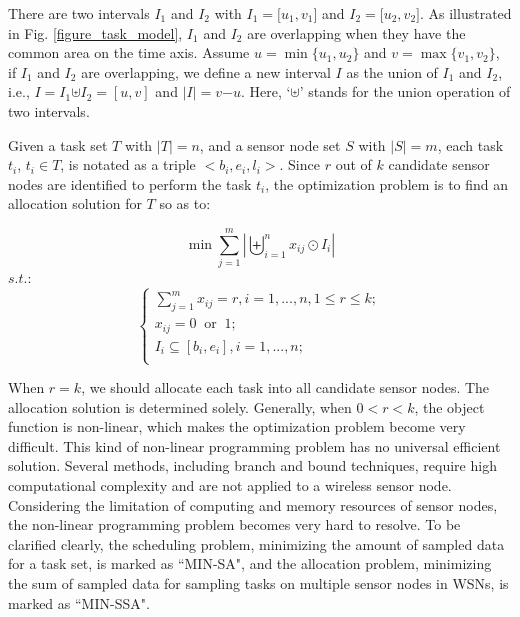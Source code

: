 \documentclass[prodmode,acmtosn]{acmsmall}
\begin{document}
\begin{definition}
There are two intervals $I_1$ and $I_2$ with $I_1\mathrm{=[}u_1, v_1\mathrm{]}$ and $I_2\mathrm{=[}u_2, v_2\mathrm{]}$. As illustrated in Fig. \ref{figure_task_model}, $I_1$ and $I_2$ are overlapping when they have the common area on the time axis.
Assume $u\mathrm{=}\min\{u_1,u_2\}$ and $v \mathrm{=}\max\{v_1,v_2\}$, if $I_1$ and $I_2$ are overlapping,  we define a new interval $I$ as the union of $I_1$ and $I_2$, i.e., $I\mathrm{=}I_1 \mathrm{\uplus} I_2\mathrm{=}[u, v]$  and $|I| \mathrm{=} v\mathrm{-}u$. Here, `$\mathrm{\uplus}$' stands for the union operation of two intervals.
\end{definition}

\begin{definition}
Given a task set $T$ with $|T|\mathrm{=}n$, and a sensor node set $S$ with $|S|\mathrm{=}m$, each task $t_i$, $t_i\mathrm{\in}T$, is notated as a triple $\mathrm{<}b_i,e_i,l_i\mathrm{>}$. Since $r$ out of $k$ candidate sensor nodes are identified to perform the task $t_i$, the optimization problem is to find an allocation solution for $T$  so as to:

\begin{equation}
\min\sum^m_{j\mathrm{=}1}{|\biguplus_{i\mathrm{=}1}^n x_{ij} \odot I_i|}
\end{equation}
$s.t.:$\\
\begin{equation}
\left\{ \begin{array}{ll}
\sum^m_{j\mathrm{=}1} x_{ij}\mathrm{=}r,i\mathrm{=}1,...,n,1\mathrm{\le} r \mathrm{\le} k;\\
x_{ij}\mathrm{=}0  \; \; \mathrm{or} \;\; 1;\\
I_i\subseteq[b_i,e_i],i\mathrm{=}1,...,n;\\

\end{array} \right.
\end{equation}
\end{definition}

When $r\mathrm{=}k$, we should allocate each task into all candidate sensor nodes. The allocation solution is determined solely. Generally, when $0\mathrm{<}r\mathrm{<}k$, the object function is non-linear, which makes the optimization problem become very difficult. This kind of non-linear programming problem has no universal efficient solution. Several methods, including branch and bound techniques, require high computational complexity and are not applied to a wireless sensor node. Considering the limitation of computing and memory resources of sensor nodes, the non-linear programming problem becomes very hard to resolve. To be clarified clearly, the scheduling problem, minimizing the amount of sampled data for a task set, is marked as ``MIN-SA", and the allocation problem, minimizing the sum of sampled data for sampling tasks on multiple sensor nodes in WSNs, is marked as ``MIN-SSA".
\end{document}
